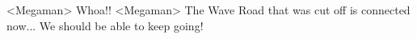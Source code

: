 <Megaman> Whoa!! 
<Megaman> The Wave Road that was cut off is connected now... 
We should be able to keep going! 
